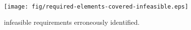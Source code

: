\begin{figure}[!ht]
\begin{center}
\texttt{[image: fig/required-elements-covered-infeasible.eps]}
\caption{\label{fig:covered-infeasible} 
infeasible requirements erroneously identified.}
\end{center}
\end{figure}
